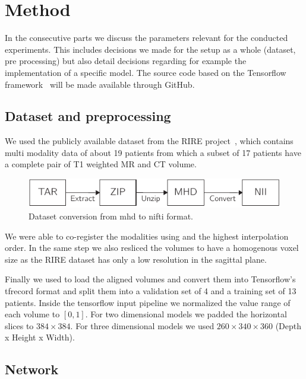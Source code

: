 \section{Method}

In the consecutive parts we discuss the parameters relevant for the conducted
experiments. This includes decisions we made for the setup as a whole
(dataset, pre processing) but also detail decisions regarding for example
the implementation of a specific model. The source code based on the
Tensorflow framework~\cite{tensorflow15} will be made available through
GitHub.

\subsection{Dataset and preprocessing}

We used the publicly available dataset from the \gls{RIRE} project~\cite{RIRE},
which contains multi modality data of about 19 patients from which a subset
of 17 patients have a complete pair of T1 weighted MR and CT volume.
\begin{figure}[h]
  \centering
  \includegraphics[width=\linewidth]{figure/conversion.pdf}
  \caption{Dataset conversion from \gls{mhd} to \gls{nifti} format.
	}\label{fig:conversion}
\end{figure}

We were able to co-register the modalities using \cite{SPM12} and the
highest interpolation order. In the same step we also resliced the volumes
to have a homogenous voxel size as the RIRE dataset has only a low resolution
in the sagittal plane.

Finally we used \cite{Nibabel} to load the aligned volumes and convert them
into Tensorflow's tfrecord format and split them into a validation set of
4 and a training set of 13 patients. Inside the tensorflow input pipeline
we normalized the value range of each volume to $[0,1]$. For two dimensional
models we padded the horizontal slices to $384\times384$. For three
dimensional models we used $260\times340\times360$ (Depth x Height x Width).

\subsection{Network}

